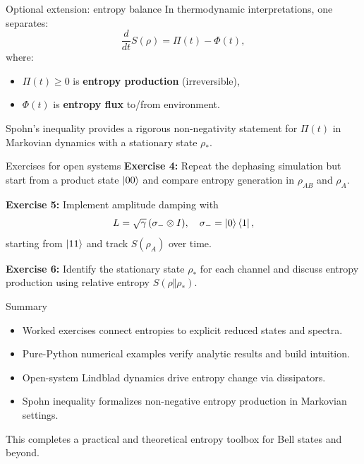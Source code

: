 \documentclass[aspectratio=169]{beamer}
\begin{document}
\begin{frame}{Optional extension: entropy balance}
In thermodynamic interpretations, one separates:
\[
\frac{d}{dt}S(\rho) = \Pi(t) - \Phi(t),
\]
where:
\begin{itemize}
\item $\Pi(t)\ge 0$ is \textbf{entropy production} (irreversible),
\item $\Phi(t)$ is \textbf{entropy flux} to/from environment.
\end{itemize}

\medskip
Spohn's inequality provides a rigorous non-negativity statement for $\Pi(t)$
in Markovian dynamics with a stationary state $\rho_\ast$.
\end{frame}

\begin{frame}{Exercises for open systems}
\textbf{Exercise 4:} Repeat the dephasing simulation but start from a product state
$\ket{00}$ and compare entropy generation in $\rho_{AB}$ and $\rho_A$.

\medskip
\textbf{Exercise 5:} Implement amplitude damping with
\[
L=\sqrt{\gamma}\,(\sigma_-\otimes I),
\quad \sigma_-=\ket{0}\bra{1},
\]
starting from $\ket{11}$ and track $S(\rho_A)$ over time.

\medskip
\textbf{Exercise 6:} Identify the stationary state $\rho_\ast$ for each channel and discuss
entropy production using relative entropy $S(\rho\Vert\rho_\ast)$.
\end{frame}

\begin{frame}{Summary}
\begin{itemize}
\item Worked exercises connect entropies to explicit reduced states and spectra.
\item Pure-Python numerical examples verify analytic results and build intuition.
\item Open-system Lindblad dynamics drive entropy change via dissipators.
\item Spohn inequality formalizes non-negative entropy production in Markovian settings.
\end{itemize}

\medskip
This completes a practical and theoretical entropy toolbox for Bell states and beyond.
\end{frame}
\end{document}
